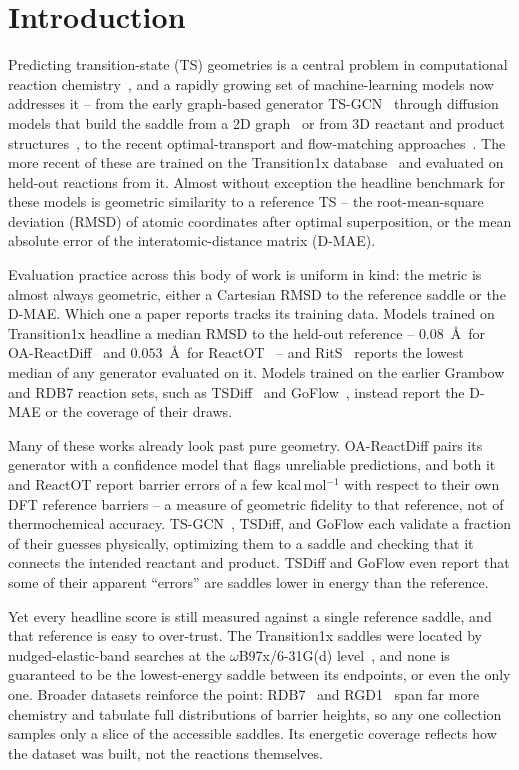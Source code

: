 \documentclass[11pt]{article}
\begin{document}
\section{Introduction}

Predicting transition-state (TS) geometries is a central problem in computational
reaction chemistry~\cite{GrinbergDana2026}, and a rapidly growing set of machine-learning models now
addresses it -- from the early graph-based generator TS-GCN~\cite{TSGCN} through
diffusion models that build the saddle from a 2D graph~\cite{TSDiff} or from 3D
reactant and product structures~\cite{Duan2023}, to the recent optimal-transport
and flow-matching approaches~\cite{ReactOT,GoFlow,RitS}. The more recent of these
are trained on the Transition1x database~\cite{Schreiner2022} and evaluated on
held-out reactions from it. Almost without
exception the headline benchmark for these models is geometric similarity to a
reference TS -- the root-mean-square deviation (RMSD) of atomic coordinates
after optimal superposition, or the mean absolute error of the
interatomic-distance matrix (D-MAE).

Evaluation practice across this body of work is uniform in kind: the metric is
almost always geometric, either a Cartesian RMSD to the reference saddle or the
D-MAE. Which one a paper reports tracks its training data. Models trained on
Transition1x headline a median RMSD to the held-out reference -- $0.08$~\AA\ for
OA-ReactDiff~\cite{Duan2023} and $0.053$~\AA\ for ReactOT~\cite{ReactOT} -- and
RitS~\cite{RitS} reports the lowest median of any generator evaluated on it. Models
trained on the earlier Grambow and RDB7 reaction sets, such as TSDiff~\cite{TSDiff}
and GoFlow~\cite{GoFlow}, instead report the D-MAE or the coverage of their draws.

Many of these works already look past pure geometry. OA-ReactDiff pairs its
generator with a confidence model that flags unreliable predictions, and both it
and ReactOT report barrier errors of a few kcal\,mol$^{-1}$ with respect to their own
DFT reference barriers -- a measure of geometric fidelity to that reference, not of
thermochemical accuracy. TS-GCN~\cite{TSGCN},
TSDiff, and GoFlow each validate a fraction of their guesses physically, optimizing
them to a saddle and checking that it connects the intended reactant and product.
TSDiff and GoFlow even report that some of their apparent ``errors'' are saddles
lower in energy than the reference.

Yet every headline score is still measured against a single reference saddle, and
that reference is easy to over-trust. The Transition1x saddles were located by
nudged-elastic-band searches at the $\omega$B97x/6-31G(d) level~\cite{Schreiner2022},
and none is guaranteed to be the lowest-energy saddle between its endpoints, or
even the only one. Broader datasets reinforce the point: RDB7~\cite{Grambow2020} and
RGD1~\cite{Zhao2023} span far more chemistry and tabulate full distributions of
barrier heights, so any one collection samples only a slice of the accessible
saddles. Its energetic coverage reflects how the dataset was built, not the
reactions themselves.
\end{document}
